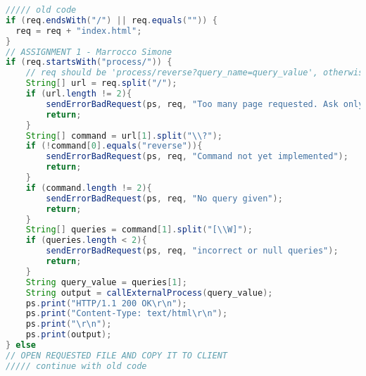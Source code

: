 \begin{lstlisting}[language=java, caption={Code added inside run()}]
///// old code
if (req.endsWith("/") || req.equals("")) {
  req = req + "index.html";
}
// ASSIGNMENT 1 - Marrocco Simone
if (req.startsWith("process/")) {
    // req should be 'process/reverse?query_name=query_value', otherwise error
    String[] url = req.split("/");
    if (url.length != 2){
        sendErrorBadRequest(ps, req, "Too many page requested. Ask only one command");
        return;
    }
    String[] command = url[1].split("\\?");
    if (!command[0].equals("reverse")){
        sendErrorBadRequest(ps, req, "Command not yet implemented");
        return;
    }
    if (command.length != 2){
        sendErrorBadRequest(ps, req, "No query given");
        return;
    }
    String[] queries = command[1].split("[\\W]");
    if (queries.length < 2){
        sendErrorBadRequest(ps, req, "incorrect or null queries");
        return;
    }
    String query_value = queries[1];
    String output = callExternalProcess(query_value);
    ps.print("HTTP/1.1 200 OK\r\n");
    ps.print("Content-Type: text/html\r\n");
    ps.print("\r\n");
    ps.print(output);
} else
// OPEN REQUESTED FILE AND COPY IT TO CLIENT
///// continue with old code
\end{lstlisting}